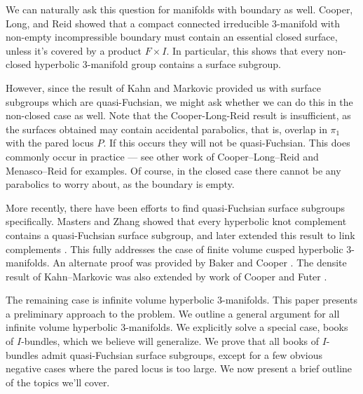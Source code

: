 We can naturally ask this question for manifolds with boundary as well.
Cooper, Long, and Reid showed \cite{CLR} that a compact connected irreducible
3-manifold with non-empty incompressible boundary  must contain an essential
closed surface, unless it's covered by a product $F\times I$. In particular,
this shows that every non-closed hyperbolic 3-manifold group contains a surface
subgroup.

However, since the result of Kahn and Markovic provided us with surface
subgroups which are quasi-Fuchsian, we might ask whether we can do this in the
non-closed case as well. Note that the Cooper-Long-Reid result is insufficient,
as the surfaces obtained may contain accidental parabolics, that is, overlap in
$\pi_1$ with the pared locus $P$. If this occurs they will not be
quasi-Fuchsian. This does commonly occur in practice --- see other work of
Cooper--Long--Reid \cite{CLRbundles} and Menasco--Reid \cite{MenascoReid} for
examples.  Of course, in the closed case there cannot be any parabolics to
worry about, as the boundary is empty.

More recently, there have been efforts to find quasi-Fuchsian surface subgroups
specifically. Masters and Zhang \cite{MZ} showed that every hyperbolic knot
complement contains a quasi-Fuchsian surface subgroup, and later extended this
result to link complements \cite{MZ2}. This fully addresses the case of finite
volume cusped hyperbolic 3-manifolds. An alternate proof was provided by Baker
and Cooper \cite{BC}. The densite result of Kahn--Markovic was also extended by
work of Cooper and Futer \cite{CooperFuter}.

The remaining case is infinite volume hyperbolic 3-manifolds. This paper
presents a preliminary approach to the problem. We outline a general argument
for all infinite volume hyperbolic 3-manifolds. We explicitly solve a special
case, books of $I$-bundles, which we believe will generalize. We prove that all
books of $I$-bundles admit quasi-Fuchsian surface subgroups, except for a few
obvious negative cases where the pared locus is too large. We now present
a brief outline of the topics we'll cover.


